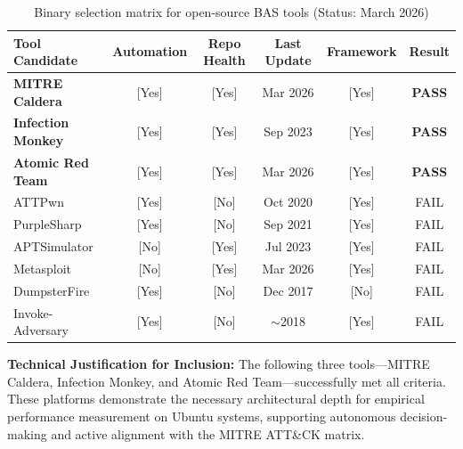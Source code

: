 \begin{table}
    \centering
    \caption{Binary selection matrix for open-source BAS tools (Status: March 2026)}
    \label{tab:phase1_checklist}
    \renewcommand{\arraystretch}{1.4}
    \begin{tabular}{|l|c|c|c|c|c|}
        \hline
        \textbf{Tool Candidate} & \textbf{Automation} & \textbf{Repo Health} & \textbf{Last Update} & \textbf{Framework} & \textbf{Result} \\ \hline
        \textbf{MITRE Caldera}    & [Yes] & [Yes] & Mar 2026 & [Yes] & \textbf{PASS} \\ \hline
        \textbf{Infection Monkey} & [Yes] & [Yes] & Sep 2023 & [Yes] & \textbf{PASS} \\ \hline
        \textbf{Atomic Red Team}  & [Yes] & [Yes] & Mar 2026 & [Yes] & \textbf{PASS} \\ \hline
        ATTPwn                    & [Yes] & [No]  & Oct 2020 & [Yes] & FAIL \\ \hline
        PurpleSharp               & [Yes] & [No]  & Sep 2021 & [Yes] & FAIL \\ \hline
        APTSimulator              & [No]  & [Yes] & Jul 2023 & [Yes] & FAIL \\ \hline
        Metasploit                & [No]  & [Yes] & Mar 2026 & [Yes] & FAIL \\ \hline
        DumpsterFire              & [Yes] & [No]  & Dec 2017 & [No]  & FAIL \\ \hline
        Invoke-Adversary          & [Yes] & [No]  & $\sim$2018 & [Yes] & FAIL \\ \hline
    \end{tabular}
\end{table}

\noindent \textbf{Technical Justification for Inclusion:}
The following three tools—MITRE Caldera, Infection Monkey, and Atomic Red Team—successfully met all criteria. These platforms demonstrate the necessary architectural depth for empirical performance measurement on Ubuntu systems, supporting autonomous decision-making and active alignment with the MITRE ATT\&CK matrix.

